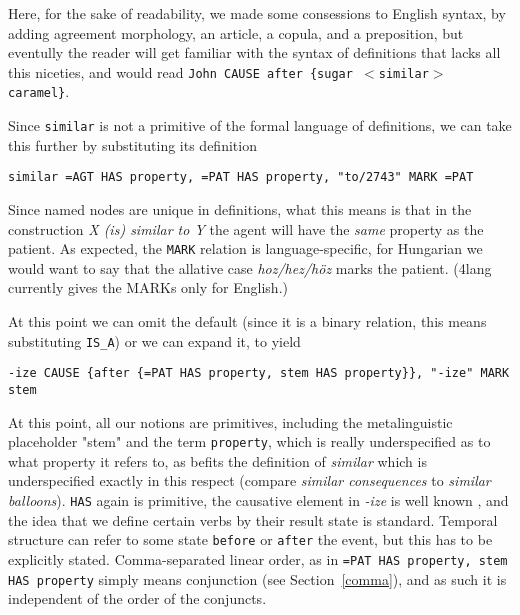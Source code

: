 \documentclass[11pt,bookmarks,bookmarksnumbered,naturalnames,plainpages=false,pdftex,colorlinks=true,urlcolor=blue,bookmarksdepth=subsection,plainpages=false]{paper}
\begin{document}
Here, for the sake of readability, we made some consessions to English syntax,
by adding agreement morphology, an article, a copula, and a preposition, but
eventully the reader will get familiar with the syntax of definitions that
lacks all this niceties, and would read {\tt John CAUSE after \{sugar $<$similar$>$
    caramel\}}. 


Since {\tt similar} is not a primitive of the formal language of definitions,
we can take this further by substituting its definition 

\begin{verbatim}
similar =AGT HAS property, =PAT HAS property, "to/2743" MARK =PAT
\end{verbatim}

\noindent
Since named nodes are unique in definitions, what this means is that in the
construction {\it X (is) similar to Y} the agent will have the {\it same}
property as the patient. As expected, the {\tt MARK} relation is
language-specific, for Hungarian we would want to say that the allative case
{\it hoz/hez/h\"{o}z} marks the patient. (4lang currently gives the MARKs only
for English.) 

At this point we can omit the default (since it is a binary relation, this
means substituting {\tt IS\_A}) or we can expand it, to yield 

\begin{verbatim}
-ize CAUSE {after {=PAT HAS property, stem HAS property}}, "-ize" MARK stem
\end{verbatim}

\noindent At this point, all our notions are primitives, including the
metalinguistic placeholder "stem" and the term {\tt property}, which is really
underspecified as to what property it refers to, as befits the definition of
{\it similar} which is underspecified exactly in this respect (compare {\it
  similar consequences} to {\it similar balloons}). {\tt HAS} again is
primitive, the causative element in {\it -ize} is well known
\citep{Lieber:1992,Plag:1998}, and the idea that we define certain verbs by
their result state is standard. Temporal structure can refer to some state
{\tt before} or {\tt after} the event, but this has to be explicitly
stated. Comma-separated linear order, as in {\tt =PAT HAS property, stem HAS
  property} simply means conjunction (see Section~\ref{comma}), and as such 
it is independent of the order of the conjuncts. 
\end{document}
